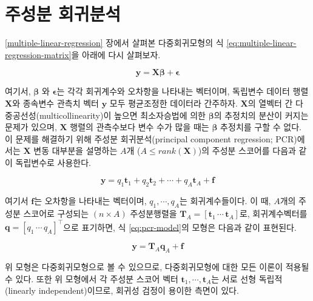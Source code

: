 \documentclass[]{book}
\begin{document}
\hypertarget{pca-regression}{%
\section{주성분 회귀분석}\label{pca-regression}}

\ref{multiple-linear-regression} 장에서 살펴본 다중회귀모형의 식 \eqref{eq:multiple-linear-regression-matrix}을 아래에 다시 살펴보자.

\begin{equation}
\mathbf{y} = \mathbf{X} \boldsymbol{\beta} + \boldsymbol{\epsilon} \label{eq:pca-multiple-linear-regression-matrix}
\end{equation}

여기서, \(\boldsymbol{\beta}\) 와 \(\boldsymbol{\epsilon}\)는 각각 회귀계수와 오차항을 나타내는 벡터이며, 독립변수 데이터 행렬 \(\mathbf{X}\)와 종속변수 관측치 벡터 \(\mathbf{y}\) 모두 평균조정한 데이터라 간주하자. \(\mathbf{X}\)의 열벡터 간 다중공선성(multicollinearity)이 높으면 최소자승법에 의한 \(\boldsymbol{\beta}\)의 추정치의 분산이 커지는 문제가 있으며, \(\mathbf{X}\) 행렬의 관측수보다 변수 수가 많을 때는 \(\boldsymbol{\beta}\) 추정치를 구할 수 없다. 이 문제를 해결하기 위해 주성분 회귀분석(principal component regression; PCR)에서는 \(\mathbf{X}\) 변동 대부분을 설명하는 \(A\)개 (\(A \leq rank(\mathbf{X})\))의 주성분 스코어를 다음과 같이 독립변수로 사용한다.

\begin{equation}
\mathbf{y} = q_1 \mathbf{t}_1 + q_2 \mathbf{t}_2 + \cdots + q_A \mathbf{t}_A + \mathbf{f} \label{eq:pcr-model}
\end{equation}

여기서 \(\mathbf{f}\)는 오차항을 나타내는 벡터이며, \(q_1, \cdots, q_A\)는 회귀계수들이다. 이 때, \(A\)개의 주성분 스코어로 구성되는 \((n \times A)\) 주성분행렬을 \(\mathbf{T}_A = [\mathbf{t}_1 \, \cdots \, \mathbf{t}_A]\)로, 회귀계수벡터를 \(\mathbf{q} = [q_1 \, \cdots \, q_A]^\top\)으로 표기하면, 식 \eqref{eq:pcr-model}의 모형은 다음과 같이 표현된다.

\begin{equation}
\mathbf{y} = \mathbf{T}_A \mathbf{q}_A + \mathbf{f} \label{eq:pcr-matrix-model}
\end{equation}

위 모형은 다중회귀모형으로 볼 수 있으므로, 다중회귀모형에 대한 모든 이론이 적용될 수 있다. 또한 위 모형에서 각 주성분 스코어 벡터 \(\mathbf{t}_1, \cdots, \mathbf{t}_A\)는 서로 선형 독립적(linearly independent)이므로, 회귀성 검정이 용이한 측면이 있다.
\end{document}
